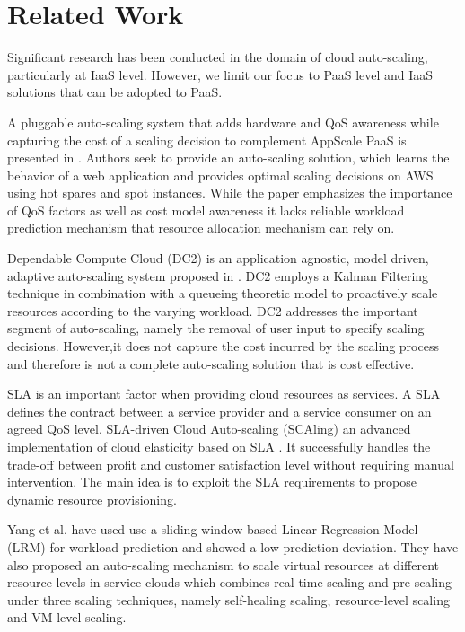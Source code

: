 \section{Related Work}
Significant research has been conducted in the domain of cloud auto-scaling, particularly at IaaS level. However, we limit our focus to PaaS level and IaaS solutions that can be adopted to PaaS.

A pluggable auto-scaling system that adds hardware and QoS awareness while capturing the cost of a scaling decision to complement AppScale PaaS is presented in \cite{pluggable}. Authors seek to provide an auto-scaling solution, which learns the behavior of a web application and provides optimal scaling decisions on AWS using hot spares and spot instances. While the paper emphasizes the importance of QoS factors as well as cost model awareness it lacks reliable workload prediction mechanism that resource allocation mechanism can rely on.

Dependable Compute Cloud (DC2) is an application agnostic, model driven, adaptive auto-scaling system proposed in \cite{modeldriven}. DC2 employs a Kalman Filtering technique in combination with a queueing theoretic model to proactively scale resources according to the varying workload. DC2 addresses the important segment of auto-scaling, namely the removal of user input to specify scaling decisions. However,it does not capture the cost incurred by the scaling process and therefore is not a complete auto-scaling solution that is cost effective.

SLA is an important factor when providing cloud resources as services. A SLA defines the contract between a service provider and a service consumer on an agreed QoS level. SLA-driven Cloud Auto-scaling (SCAling) an advanced implementation of cloud elasticity based on SLA \cite{sladriven}. It successfully handles the trade-off between profit and customer satisfaction level without requiring manual intervention. The main idea is to exploit the SLA requirements to propose dynamic resource provisioning.

Yang et al. \cite{Yang_2013} have used use a sliding window based Linear Regression Model (LRM) for workload prediction and showed a low prediction deviation. They have also proposed an auto-scaling mechanism to scale virtual resources at different resource levels in service clouds which combines real-time scaling and pre-scaling under three scaling techniques, namely self-healing scaling, resource-level scaling and VM-level scaling.

